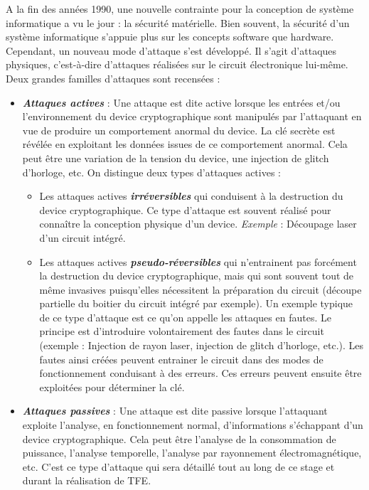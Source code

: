 \documentclass[10pt, oneside, a4paper]{article}
\begin{document}
A la fin des années 1990, une nouvelle contrainte pour la conception de système informatique a vu le jour : la sécurité matérielle. Bien souvent, la sécurité d'un système informatique s'appuie plus sur les concepts software que hardware. Cependant, un nouveau mode d'attaque s'est développé. Il s'agit d'attaques physiques, c'est-à-dire d'attaques réalisées sur le circuit électronique lui-même. Deux grandes familles d'attaques sont recensées : 
\begin{itemize}
\item \textbf{\textit{Attaques actives}} : Une attaque est dite active lorsque les entrées et/ou l'environnement du device cryptographique sont manipulés par l'attaquant en vue de produire un comportement anormal du device. La clé secrète est révélée en exploitant les données issues de ce comportement anormal. Cela peut être une variation de la tension du device, une injection de glitch d'horloge, etc. On distingue deux types d'attaques actives : 
\begin{itemize}
\item Les attaques actives \textbf{\textit{irréversibles}} qui conduisent à la destruction du device cryptographique. Ce type d'attaque est souvent réalisé pour connaître la conception physique d'un device. \textit{Exemple} : Découpage laser d’un circuit intégré.
\item Les attaques actives \textbf{\textit{pseudo-réversibles}} qui n’entrainent pas forcément la destruction du device cryptographique, mais qui sont souvent tout de même invasives puisqu’elles nécessitent la préparation du circuit (découpe partielle du boitier du circuit intégré par exemple). Un exemple typique de ce type d'attaque est ce qu'on appelle les attaques en fautes. Le principe est d'introduire volontairement des fautes dans le circuit (exemple : Injection de rayon laser, injection de glitch d’horloge, etc.). Les fautes ainsi créées peuvent entrainer le circuit dans des modes de fonctionnement conduisant à des erreurs. Ces erreurs peuvent ensuite être exploitées pour déterminer la clé.
\end{itemize}
\item \textbf{\textit{Attaques passives}} : Une attaque est dite passive lorsque l'attaquant exploite l'analyse, en fonctionnement normal, d'informations s'échappant d'un device cryptographique. Cela peut être l'analyse de la consommation de puissance, l'analyse temporelle, l'analyse par rayonnement électromagnétique, etc. C'est ce type d'attaque qui sera détaillé tout au long de ce stage et durant la réalisation de TFE. \\
\end{itemize}
\end{document}
